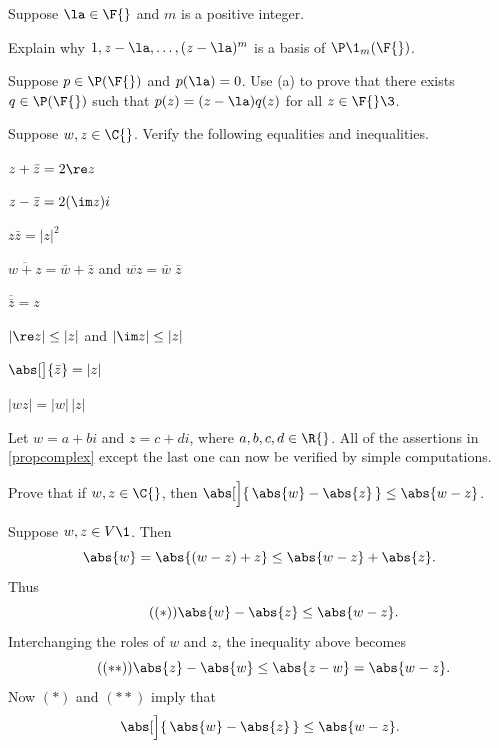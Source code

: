 
\exercise
Suppose $\la \in \F{}$ and $m$ is a positive integer.
\begin{subtheorem}
\item
Explain why $1, z-\la, \ldots, (z-\la)^m$ is a basis of $\P\1_m(\F{})$.
\item
Suppose $p \in \P(\F{})$ and $p(\la) = 0$. Use (a) to prove that there exists $q \in \P(\F{})$ such that $p(z) = (z-\la) q(z)$ for all
$z \in \F{}\3$.
\end{subtheorem}

\exercise
Suppose $w, z \in \C{}$. Verify the following equalities and inequalities.
\begin{subtheorem} \addtolength{\itemsep}{2bp}
\item
$z + \bar{z} = 2 \re z$

\item
$z - \bar{z} = 2( \im z)i$

\item
$z \bar{z} = |z|^2$

\item
$\overline{w + z} = \bar{w} + \bar{z}$  and $\overline{wz} = \bar{w} \; \bar{z}$

\item
$\overline{\bar{z}} = z$

\item
$| \re z | \le |z|$ and $| \im z | \le |z|$

\item
$\abs[\big]{\bar{z}} = |z|$

\item
$|wz| = |w|\,|z|$
\end{subtheorem}

\begin{Solution}
Let $w = a + bi$ and $z = c + di$, where $a, b, c, d \in \R{}$. All of the assertions in \ref{propcomplex} except the last one can now be verified by simple computations.
\end{Solution}

\exercise
Prove that if $w, z \in \C{}$, then $\abs[\Big]{\, \abs{w} - \abs{z} \,} \le \abs{w-z}$. \label{4reverse}

\begin{Solution}
Suppose $w, z \in V\1$. Then
\[
\abs{w} = \abs{(w-z) + z} \le \abs{w-z} + \abs{z}.
\]
Thus
\[ \tag{$(*)$}
\abs{w} - \abs{z} \le \abs{w-z}.
\]
Interchanging the roles of $w$ and $z$, the inequality above becomes
\[ \tag{$(**)$}
\abs{z} - \abs{w} \le \abs{z-w} = \abs{w-z}.
\]
Now $(*)$ and $(**)$ imply that
\[
\abs[\Big]{\, \abs{w} - \abs{z} \,} \le \abs{w-z}.
\]
\end{Solution}


